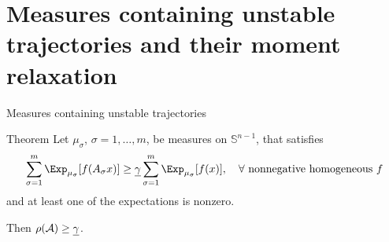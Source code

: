 \documentclass{beamer}
\begin{document}
  \section{Measures containing unstable trajectories and their moment relaxation}

  \begin{frame}{Measures containing unstable trajectories}
      \begin{block}{Theorem}
          Let $\mu_{\sigma}$, $\sigma=1, \ldots, m$, be measures on $\mathbb{S}^{n-1}$,
          that satisfies
          \[ \sum_{\sigma = 1}^m \Exp_{\mu_\sigma}[f(A_\sigma x)] \geq \gamlb \sum_{\sigma = 1}^m \Exp_{\mu_\sigma}[f(x)], \quad \forall \text{ nonnegative homogeneous } f \]
          and at least one of the expectations is nonzero.

          Then  $\rho(\mathcal{A}) \geq \underline{\gamma}$.
      \end{block}
  \end{frame}
\end{document}
